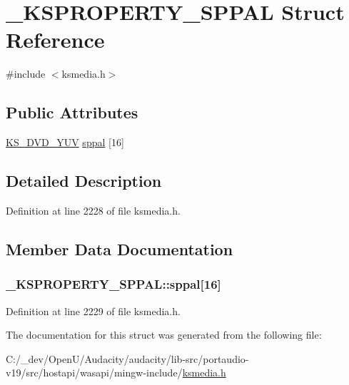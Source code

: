 \hypertarget{struct___k_s_p_r_o_p_e_r_t_y___s_p_p_a_l}{}\section{\+\_\+\+K\+S\+P\+R\+O\+P\+E\+R\+T\+Y\+\_\+\+S\+P\+P\+AL Struct Reference}
\label{struct___k_s_p_r_o_p_e_r_t_y___s_p_p_a_l}


{\ttfamily \#include $<$ksmedia.\+h$>$}

\subsection*{Public Attributes}
\begin{DoxyCompactItemize}
\item 
\hyperlink{ksmedia_8h_a6024249af10740500f6ff9cb8c50f952}{K\+S\+\_\+\+D\+V\+D\+\_\+\+Y\+UV} \hyperlink{struct___k_s_p_r_o_p_e_r_t_y___s_p_p_a_l_a41c276914691529bb8f2330712bc6b40}{sppal} \mbox{[}16\mbox{]}
\end{DoxyCompactItemize}


\subsection{Detailed Description}


Definition at line 2228 of file ksmedia.\+h.



\subsection{Member Data Documentation}
\subsubsection[{\texorpdfstring{sppal}{sppal}}]{ \+\_\+\+K\+S\+P\+R\+O\+P\+E\+R\+T\+Y\+\_\+\+S\+P\+P\+A\+L\+::sppal\mbox{[}16\mbox{]}}\hypertarget{struct___k_s_p_r_o_p_e_r_t_y___s_p_p_a_l_a41c276914691529bb8f2330712bc6b40}{}\label{struct___k_s_p_r_o_p_e_r_t_y___s_p_p_a_l_a41c276914691529bb8f2330712bc6b40}


Definition at line 2229 of file ksmedia.\+h.



The documentation for this struct was generated from the following file\+:\begin{DoxyCompactItemize}
\item 
C\+:/\+\_\+dev/\+Open\+U/\+Audacity/audacity/lib-\/src/portaudio-\/v19/src/hostapi/wasapi/mingw-\/include/\hyperlink{ksmedia_8h}{ksmedia.\+h}\end{DoxyCompactItemize}
